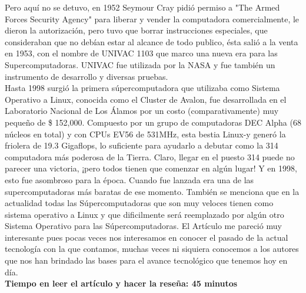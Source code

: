\documentclass[a4paper, 11pt, oneside]{article}
\begin{document}
Pero aquí no se detuvo, en 1952 Seymour Cray pidió permiso a "The Armed Forces Security Agency" para liberar y vender la computadora comercialmente, le dieron la autorización, pero tuvo que borrar instrucciones especiales, que consideraban que no debían estar al alcance de todo publico, ésta salió a la venta en 1953, con el nombre de UNIVAC 1103 que marco una nueva era para las Supercomputadoras. UNIVAC fue utilizada por la NASA y fue también un instrumento de desarrollo y diversas pruebas.\\
Hasta 1998 surgió la primera súpercomputadora que utilizaba como Sistema Operativo a Linux, conocida como el Cluster de Avalon, fue desarrollada en el Laboratorio Nacional de Los Álamos por un costo (comparativamente) muy pequeño de \$ 152,000. Compuesto por un grupo de computadoras DEC Alpha (68 núcleos en total) y con CPUs EV56 de 531MHz, esta bestia Linux-y generó la friolera de 19.3 Gigaflops, lo suficiente para ayudarlo a debutar como la 314 computadora más poderosa de la Tierra. Claro, llegar en el puesto 314 puede no parecer una victoria, ¡pero todos tienen que comenzar en algún lugar! Y en 1998, esto fue asombroso para la época. Cuando fue lanzada era una de las supercomputadoras más baratas de ese momento. También se menciona que en la actualidad todas las Súpercomputadoras que son muy veloces tienen como sistema operativo a Linux y que dificilmente será reemplazado por algún otro Sistema Operativo para las Súpercomputadoras. El Artículo me pareció muy interesante pues pocas veces nos interesamos en conocer el pasado de la actual tecnología con la que contamos, muchas veces ni siquiera conocemos a los autores que nos han brindado las bases para el avance tecnológico que tenemos hoy en día.\\
\textbf{Tiempo en leer el artículo y hacer la reseña: 45 minutos}

\end{document}
